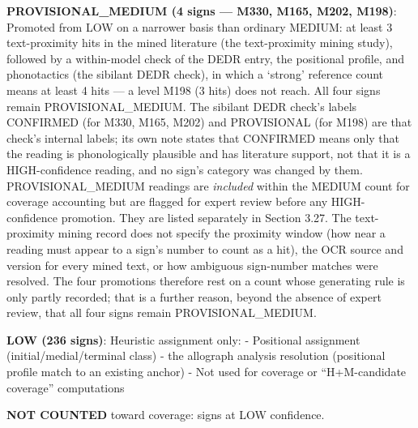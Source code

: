 \documentclass[11pt]{article}
\begin{document}
\textbf{PROVISIONAL\_MEDIUM (4 signs --- M330, M165, M202, M198)}: Promoted from LOW on a narrower basis than ordinary MEDIUM: at least 3 text-proximity hits in the mined literature (the text-proximity mining study), followed by a within-model check of the DEDR entry, the positional profile, and phonotactics (the sibilant DEDR check), in which a `strong' reference count means at least 4 hits --- a level M198 (3 hits) does not reach. All four signs remain PROVISIONAL\_MEDIUM. The sibilant DEDR check's labels CONFIRMED (for M330, M165, M202) and PROVISIONAL (for M198) are that check's internal labels; its own note states that CONFIRMED means only that the reading is phonologically plausible and has literature support, not that it is a HIGH-confidence reading, and no sign's category was changed by them. PROVISIONAL\_MEDIUM readings are
\emph{included} within the MEDIUM count for coverage accounting but are flagged for
expert review before any HIGH-confidence promotion. They are listed separately in Section 3.27. The text-proximity mining record does not specify the proximity window (how near a reading must appear to a sign's number to count as a hit), the OCR source and version for every mined text, or how ambiguous sign-number matches were resolved. The four promotions therefore rest on a count whose generating rule is only partly recorded; that is a further reason, beyond the absence of expert review, that all four signs remain PROVISIONAL\_MEDIUM.

\textbf{LOW (236 signs)}: Heuristic assignment only: - Positional
assignment (initial/medial/terminal class) - the allograph analysis
resolution (positional profile match to an existing anchor) - Not used
for coverage or ``H+M-candidate coverage'' computations

\textbf{NOT COUNTED} toward coverage: signs at LOW confidence.
\end{document}
